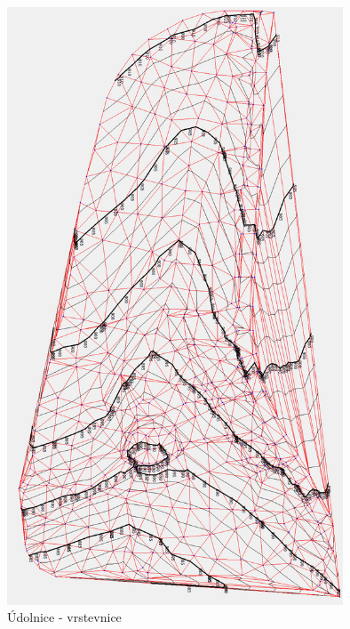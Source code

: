 \documentclass[a4paper, 12pt]{article}
\begin{document}
\begin{figure}[h]
	\centering
	\includegraphics[width=10cm]{DMT_vrstevnice.jpg}
	\caption{Údolnice - vrstevnice}
\end{figure}
\end{document}
